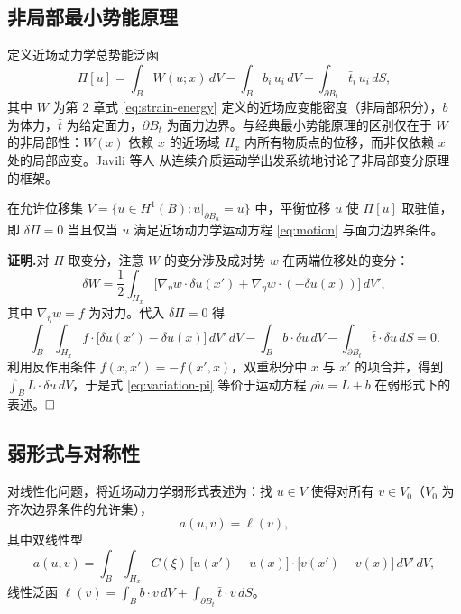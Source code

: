 \subsection{非局部最小势能原理}
\label{subsec:nonlocal-potential}

定义近场动力学总势能泛函
\begin{equation}
\label{eq:pd-potential}
\Pi[u] = \int_B W(u;x)\,dV - \int_B b_i\,u_i\,dV - \int_{\partial B_t}\bar{t}_i\,u_i\,dS,
\end{equation}
其中 $W$ 为第 2 章式 \eqref{eq:strain-energy} 定义的近场应变能密度（非局部积分），$b$ 为体力，$\bar{t}$ 为给定面力，$\partial B_t$ 为面力边界。与经典最小势能原理的区别仅在于 $W$ 的非局部性：$W(x)$ 依赖 $x$ 的近场域 $H_x$ 内所有物质点的位移，而非仅依赖 $x$ 处的局部应变。Javili 等人 \cite{Javili2019} 从连续介质运动学出发系统地讨论了非局部变分原理的框架。

\begin{theorem}[非局部最小势能原理]
\label{thm:nonlocal-potential}
在允许位移集 $V=\{u\in H^1(B):u|_{\partial B_u}=\bar{u}\}$ 中，平衡位移 $u$ 使 $\Pi[u]$ 取驻值，即 $\delta\Pi=0$ 当且仅当 $u$ 满足近场动力学运动方程 \eqref{eq:motion} 与面力边界条件。
\end{theorem}

\noindent\textbf{证明.}\quad 对 $\Pi$ 取变分，注意 $W$ 的变分涉及成对势 $w$ 在两端位移处的变分：
\begin{equation}
\label{eq:variation-W}
\delta W = \frac{1}{2}\int_{H_x}\bigl[\nabla_\eta w\cdot\delta u(x') + \nabla_\eta w\cdot(-\delta u(x))\bigr]\,dV',
\end{equation}
其中 $\nabla_\eta w=f$ 为对力。代入 $\delta\Pi=0$ 得
\begin{equation}
\label{eq:variation-pi}
\int_B\int_{H_x} f\cdot\bigl[\delta u(x')-\delta u(x)\bigr]\,dV'\,dV - \int_B b\cdot\delta u\,dV - \int_{\partial B_t}\bar{t}\cdot\delta u\,dS = 0.
\end{equation}
利用反作用条件 $f(x,x')=-f(x',x)$，双重积分中 $x$ 与 $x'$ 的项合并，得到 $\int_B L\cdot\delta u\,dV$，于是式 \eqref{eq:variation-pi} 等价于运动方程 $\rho\ddot{u}=L+b$ 在弱形式下的表述。$\hfill\square$

\subsection{弱形式与对称性}
\label{subsec:weak-form-symmetry}

对线性化问题，将近场动力学弱形式表述为：找 $u\in V$ 使得对所有 $v\in V_0$（$V_0$ 为齐次边界条件的允许集），
\begin{equation}
\label{eq:pd-weak-form}
a(u,v) = \ell(v),
\end{equation}
其中双线性型
\begin{equation}
\label{eq:bilinear-form}
a(u,v) = \int_B\int_{H_x} C(\xi)\,\bigl[u(x')-u(x)\bigr]\cdot\bigl[v(x')-v(x)\bigr]\,dV'\,dV,
\end{equation}
线性泛函 $\ell(v)=\int_B b\cdot v\,dV+\int_{\partial B_t}\bar{t}\cdot v\,dS$。

